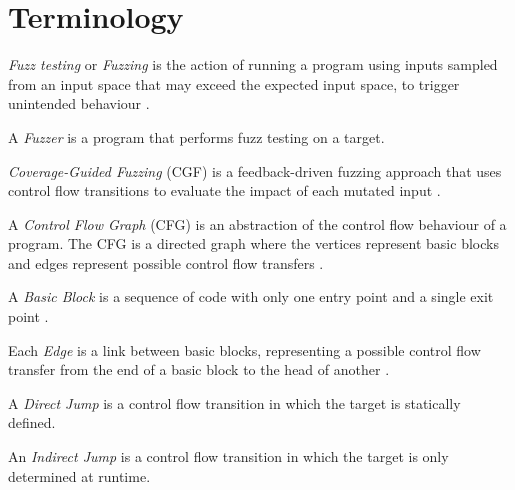 \section{Terminology}

\begin{defin}[Fuzzing]
    \textit{Fuzz testing} or \textit{Fuzzing} is the action of running a program using inputs sampled from an input space that may exceed the expected input space, to trigger unintended behaviour \cite{manes2019art}.
\end{defin}

\begin{defin}[Fuzzer]
    A \textit{Fuzzer} is a program that performs fuzz testing on a target.
\end{defin}

\begin{defin}
    \textit{Coverage-Guided Fuzzing} (CGF) is a feedback-driven fuzzing approach that uses control flow transitions to evaluate the impact of each mutated input \cite{zalewski2014afltech}.
\end{defin}

\begin{defin}
    A \textit{Control Flow Graph} (CFG) is an abstraction of the control flow behaviour of a program. The CFG is a directed graph where the vertices represent basic blocks and edges represent possible control flow transfers \cite{allen1970control}.
\end{defin}

\begin{defin}
    A \textit{Basic Block} is a sequence of code with only one entry point and a single exit point \cite{gccinternals}.
\end{defin}

\begin{defin}[Edge]
    Each \textit{Edge} is a link between basic blocks, representing a possible control flow transfer from the end of a basic block to the head of another \cite{gccinternals}.
\end{defin}

\begin{defin}
    A \textit{Direct Jump} is a control flow transition in which the target is statically defined.
\end{defin}

\begin{defin}
    An \textit{Indirect Jump} is a control flow transition in which the target is only determined at runtime.
\end{defin}

